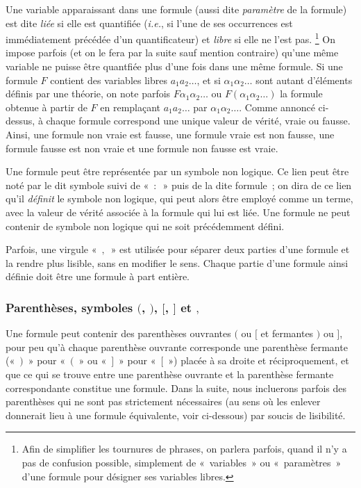 Une variable apparaissant dans une formule (aussi dite \textit{paramètre} de la formule) est dite \textit{liée} si elle est quantifiée (\textit{i.e.}, si l'une de ses occurrences est immédiatement précédée d'un quantificateur) et \textit{libre} si elle ne l'est pas.%
\footnote{
    Afin de simplifier les tournures de phrases, on parlera parfois, quand il n'y a pas de confusion possible, simplement de « variables » ou « paramètres » d'une formule pour désigner ses variables libres. 
}
On impose parfois (et on le fera par la suite sauf mention contraire) qu'une même variable ne puisse être quantfiée plus d'une fois dans une même formule.
Si une formule $F$ contient des variables libres $a_1 a_2 \dots$, et si $\alpha_1 \alpha_2 \dots$ sont autant d'éléments définis par une théorie, on note parfois $F \alpha_1 \alpha_2 \dots$ ou $F (\alpha_1 \alpha_2 \dots)$ la formule obtenue à partir de $F$ en remplaçant $a_1 a_2 \dots$ par $\alpha_1 \alpha_2 \dots$.
Comme annoncé ci-dessus, à chaque formule correspond une unique valeur de vérité, vraie ou fausse. 
Ainsi, une formule non vraie est fausse, une formule vraie est non fausse, une formule fausse est non vraie et une formule non fausse est vraie.

Une formule peut être représentée par un symbole non logique. 
Ce lien peut être noté par le dit symbole suivi de « $:$ » puis de la dite formule ; on dira de ce lien qu'il \textit{définit} le symbole non logique, qui peut alors être employé comme un terme, avec la valeur de vérité associée à la formule qui lui est liée. 
Une formule ne peut contenir de symbole non logique qui ne soit précédemment défini. 

Parfois, une virgule « $,$ » est utilisée pour séparer deux parties d'une formule et la rendre plus lisible, sans en modifier le sens. 
Chaque partie d'une formule ainsi définie doit être une formule à part entière. 

\subsubsection{Parenthèses, symboles $($, $)$, $[$, $]$ et $,$}

Une formule peut contenir des parenthèses ouvrantes $($ ou $[$ et fermantes $)$ ou $]$, pour peu qu'à chaque parenthèse ouvrante corresponde une parenthèse fermante (« $)$ » pour « $($ » ou « $]$ » pour « $[$ ») placée à sa droite et réciproquement, et que ce qui se trouve entre une parenthèse ouvrante et la parenthèse fermante correspondante constitue une formule. 
Dans la suite, nous incluerons parfois des parenthèses qui ne sont pas strictement nécessaires (au sens où les enlever donnerait lieu à une formule équivalente, voir ci-dessous) par soucis de lisibilité.

